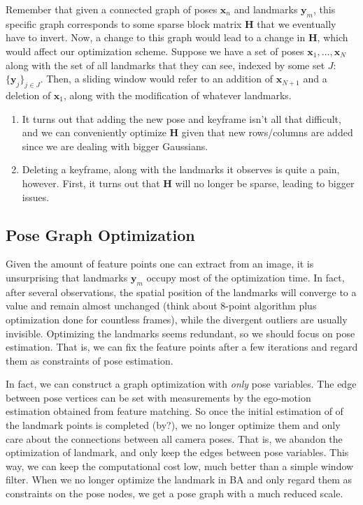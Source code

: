 \documentclass{article}
\theoremstyle{definition}
\theoremstyle{remark}
\theoremstyle{definition}
\begin{document}
Remember that given a connected graph of poses $\mathbf{x}_n$ and landmarks $\mathbf{y}_m$, this specific graph corresponds to some sparse block matrix $\mathbf{H}$ that we eventually have to invert. Now, a change to this graph would lead to a change in $\mathbf{H}$, which would affect our optimization scheme. Suppose we have a set of poses $\mathbf{x}_1, \ldots, \mathbf{x}_N$ along with the set of all landmarks that they can see, indexed by some set $J$: $\{\mathbf{y}_j\}_{j \in J}$. Then, a sliding window would refer to an addition of $\mathbf{x}_{N+1}$ and a deletion of $\mathbf{x}_1$, along with the modification of whatever landmarks. 
\begin{enumerate}
    \item It turns out that adding the new pose and keyframe isn't all that difficult, and we can conveniently optimize $\mathbf{H}$ given that new rows/columns are added since we are dealing with bigger Gaussians. 
    \item Deleting a keyframe, along with the landmarks it observes is quite a pain, however. First, it turns out that $\mathbf{H}$ will no longer be sparse, leading to bigger issues. 
\end{enumerate}

\subsection{Pose Graph Optimization}
Given the amount of feature points one can extract from an image, it is unsurprising that landmarks $\mathbf{y}_m$ occupy most of the optimization time. In fact, after several observations, the spatial position of the landmarks will converge to a value and remain almost unchanged (think about 8-point algorithm plus optimization done for countless frames), while the divergent outliers are usually invisible. Optimizing the landmarks seems redundant, so we should focus on pose estimation. That is, we can fix the feature points after a few iterations and regard them as constraints of pose estimation. 

In fact, we can construct a graph optimization with \textit{only} pose variables. The edge between pose vertices can be set with measurements by the ego-motion estimation obtained from feature matching. So once the initial estimation of of the landmark points is completed (by?), we no longer optimize them and only care about the connections between all camera poses. That is, we abandon the optimization of landmark, and only keep the edges between pose variables. This way, we can keep the computational cost low, much better than a simple window filter. When we no longer optimize the landmark in BA and only regard them as constraints on the pose nodes, we get a pose graph with a much reduced scale. 
\end{document}
